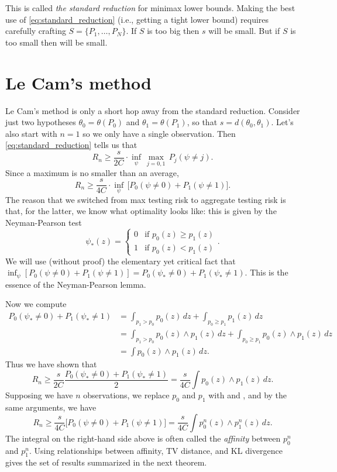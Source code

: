 \documentclass{article}
\begin{document}
This is called \emph{the standard reduction} for minimax lower bounds. Making
the best use of \eqref{eq:standard_reduction} (i.e., getting a tight lower
bound) requires carefully crafting $S = \{P_1,\dots,P_N\}$. If $S$ is too big
then $s$ will be small. But if $S$ is too small then  will be small.    

\section{Le Cam's method}

\def\TV{\mathrm{TV}}

Le Cam's method is only a short hop away from the standard reduction. Consider
just two hypotheses $\theta_0 = \theta(P_0)$ and $\theta_1 = \theta(P_1)$, so
that $s = d(\theta_0,\theta_1)$. Let's also start with $n=1$ so we only have a
single observation. Then \eqref{eq:standard_reduction} tells us that
\[
R_n \geq \frac{s}{2C} \cdot \inf_\psi \, \max_{j=0,1} \, P_j(\psi \not= j). 
\]
Since a maximum is no smaller than an average,
\[
R_n \geq \frac{s}{4C} \cdot \inf_\psi \, \big[ P_0(\psi \not= 0) + P_1(\psi
\not= 1) \big]. 
\]
The reason that we switched from max testing risk to aggregate testing risk is 
that, for the latter, we know what optimality looks like: this is given by the
Neyman-Pearson test
\[
\psi_*(z) =
\begin{cases}
0 & \text{if $p_0(z) \geq p_1(z)$} \\
1 & \text{if $p_0(z) < p_1(z)$}
\end{cases}.
\]
We will use (without proof) the elementary yet critical fact that
$\inf_\psi [ P_0(\psi \not= 0) + P_1(\psi \not= 1)] = P_0(\psi_* \not= 0) +
P_1(\psi_* \not= 1)$. This is the essence of the Neyman-Pearson lemma.  

Now we compute
\begin{align*}
P_0(\psi_* \not= 0) + P_1(\psi_* \not= 1) 
&= \int_{p_1 > p_0} p_0(z) \, dz + \int_{p_0 \geq p_1} p_1(z) \, dz \\ 
&= \int_{p_1 > p_0} p_0(z) \wedge p_1(z) \, dz + \int_{p_0 \geq p_1} 
p_0(z)\wedge p_1(z) \, dz \\
&= \int p_0(z) \wedge p_1(z) \, dz.
\end{align*}
Thus we have shown that
\[
R_n \geq \frac{s}{2C} \frac{P_0(\psi_* \not= 0) + P_1(\psi_* \not= 1)}{2} 
= \frac{s}{4C} \int p_0(z) \wedge p_1(z) \, dz.
\]
Supposing we have $n$ observations, we replace $p_0$ and $p_1$ with 
 and , and by the same arguments, we have
\begin{equation}
\label{eq:lecam_affinity}
R_n \geq \frac{s}{4C} \big[ P_0(\psi \not= 0) + P_1(\psi \not= 1) \big]  
= \frac{s}{4C} \int p_0^n(z) \wedge p_1^n(z) \, dz. 
\end{equation}
The integral on the right-hand side above is often called the \emph{affinity}
between $p_0^n$ and $p_1^n$. Using relationships between affinity, TV distance,
and KL divergence gives the set of results summarized in the next theorem. 
\end{document}
